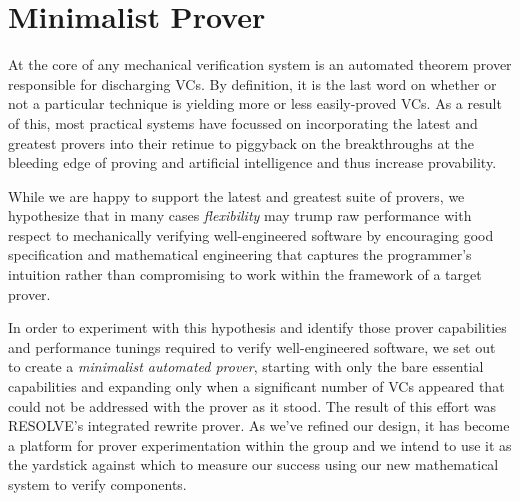 \section{Minimalist Prover\label{sec:researchProver}}
At the core of any mechanical verification system is an automated theorem prover responsible for discharging VCs.  By definition, it is the last word on whether or not a particular technique is yielding more or less easily-proved VCs.  As a result of this, most practical systems have focussed on incorporating the latest and greatest provers into their retinue to piggyback on the breakthroughs at the bleeding edge of proving and artificial intelligence and thus increase provability.

While we are happy to support the latest and greatest suite of provers, we hypothesize that in many cases \emph{flexibility} may trump raw performance with respect to mechanically verifying well-engineered software by encouraging good specification and mathematical engineering that captures the programmer's intuition rather than compromising to work within the framework of a target prover.

In order to experiment with this hypothesis and identify those prover capabilities and performance tunings required to verify well-engineered software, we set out to create a \emph{minimalist automated prover}, starting with only the bare essential capabilities and expanding only when a significant number of VCs appeared that could not be addressed with the prover as it stood.  The result of this effort was RESOLVE's integrated rewrite prover.  As we've refined our design, it has become a platform for prover experimentation within the group and we intend to use it as the yardstick against which to measure our success using our new mathematical system to verify components.

